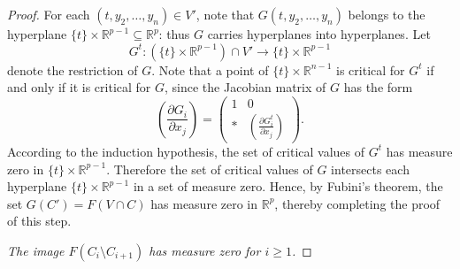 \documentclass[11pt]{article}
\theoremstyle{thmstyle}
\theoremstyle{defstyle}
\newcommand{\R}{\mathbb{R}}
\renewcommand{\ge}{\geqslant}
\begin{document}
\begin{proof}
	For each $(t, y_2,\dots, y_n)\in V'$, note that $G(t, y_2,\dots, y_n)$ belongs to the hyperplane $\{t\}\times\R^{p - 1}\subseteq\R^p$: thus $G$ carries hyperplanes into hyperplanes. Let 
	\begin{equation*}
		G^t\colon \left(\{t\}\times\R^{p - 1}\right)\cap V'\to\{t\}\times\R^{p - 1}
	\end{equation*}
	denote the restriction of $G$. Note that a point of $\{t\}\times\R^{n - 1}$ is critical for $G^t$ if and only if it is critical for $G$, since the Jacobian matrix of $G$ has the form 
	\begin{equation*}
		\left(\frac{\partial G_i}{\partial x_j}\right) = 
		\begin{pmatrix}
			1 & 0\\
			\ast & \left(\frac{\partial G_i^t}{\partial x_j}\right)
		\end{pmatrix}.
	\end{equation*}
	According to the induction hypothesis, the set of critical values of $G^t$ has measure zero in $\{t\}\times\R^{p - 1}$. Therefore the set of critical values of $G$ intersects each hyperplane $\{t\}\times\R^{p - 1}$ in a set of measure zero. Hence, by Fubini's theorem, the set $G(C') = F(V\cap C)$ has measure zero in $\R^p$, thereby completing the proof of this step.

	 \emph{The image $F(C_i\setminus C_{i + 1})$ has measure zero for $i\ge 1$.}


\end{proof}
\end{document}
